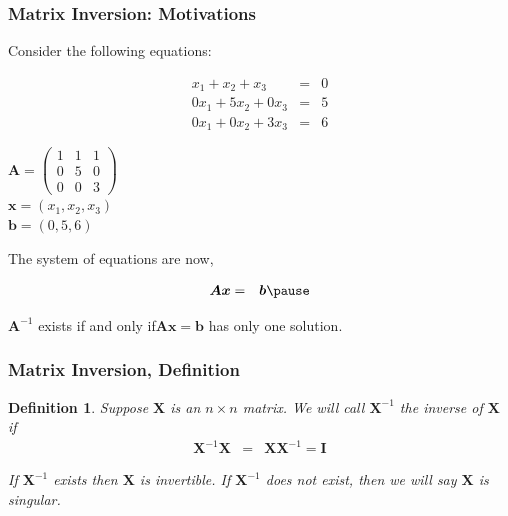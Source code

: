 \documentclass[handout]{beamer}
\newtheorem{defn}{Definition}
\numberwithin{equation}{section}
\begin{document}
\begin{frame}
\frametitle{Matrix Inversion: Motivations} 

Consider the following equations:

\begin{eqnarray}
x_{1} + x_{2} + x_{3} &=& 0 \nonumber \\
0x_{1} 	+ 	5x_{2} + 0x_{3}  & =& 5 \nonumber \\
0 x_{1} + 0 x_{2} + 3 x_{3} & = & 6 \nonumber
\end{eqnarray} \pause

$\boldsymbol{A}  = \begin{pmatrix} 1 & 1 & 1 \\ 0 & 5 & 0 \\ 0 & 0 & 3 \end{pmatrix} $   \\ \pause 
$\boldsymbol{x} = (x_{1} , x_{2}, x_{3} ) $ \\ \pause 
$\boldsymbol{b} = (0, 5, 6)$ \pause 

The system of equations are now, \pause 

\begin{eqnarray}
\boldsymbol{A}\boldsymbol{x} & = & \boldsymbol{b} \nonumber  \pause 
\end{eqnarray}

$\boldsymbol{A}^{-1}$ exists if and only if$\boldsymbol{A}\boldsymbol{x}  =  \boldsymbol{b}$ has only one solution.


\end{frame}



\begin{frame}
\frametitle{Matrix Inversion, Definition}

\begin{defn} Suppose $\boldsymbol{X}$ is an $n \times n$ matrix.  We will call $\boldsymbol{X}^{-1}$ the inverse of $\boldsymbol{X}$ if
\begin{eqnarray}
\boldsymbol{X}^{-1} \boldsymbol{X} & = & \boldsymbol{X} \boldsymbol{X}^{-1} = \boldsymbol{I} \nonumber 
\end{eqnarray}

If $\boldsymbol{X}^{-1}$ exists then $\boldsymbol{X}$ is invertible.  If $\boldsymbol{X}^{-1}$ does not exist, then we will say $\boldsymbol{X}$ is singular.  
\end{defn}

\end{frame}
\end{document}
